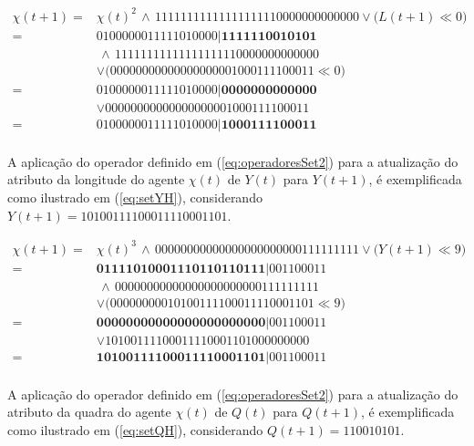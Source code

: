 \begin{equation}
 \begin{split}
 \chi(t + 1)   = & \chi(t)^2 \, \wedge \, 11111111111111111110000000000000 \vee \big(L(t + 1) \ll 0\big) \\
	       = & 0 1 0 0 0 0 0 0 1 1 1 1 1 0 1 0 0 0 0 | \boldsymbol{1 1 1 1 1 1 0 0 1 0 1 0 1} \\
	         & \, \wedge \, 11111111111111111110000000000000 \\
	         & \vee \big(00000000000000000001000111100011 \ll 0\big) \\
	       = & 0 1 0 0 0 0 0 0 1 1 1 1 1 0 1 0 0 0 0 | \boldsymbol{0 0 0 0 0 0 0 0 0 0 0 0 0} \\
	         & \vee 00000000000000000001000111100011 \\
	       = & 0 1 0 0 0 0 0 0 1 1 1 1 1 0 1 0 0 0 0 | \boldsymbol{1 0 0 0 1 1 1 1 0 0 0 1 1} \\
 \label{eq:setLH}
 \end{split}
\end{equation}

A aplicação do operador definido em (\ref{eq:operadoresSet2}) para a atualização do atributo da longitude do agente $\chi(t)$ de $Y(t)$ para $Y(t + 1)$, é exemplificada como ilustrado em (\ref{eq:setYH}), considerando $Y(t + 1) = 1 0 1 0 0 1 1 1 1 0 0 0 1 1 1 1 0 0 0 1 1 0 1$.

\begin{equation}
 \begin{split}
 \chi(t + 1)   = & \chi(t)^3 \, \wedge \, 00000000000000000000000111111111 \vee \big(Y(t + 1) \ll 9\big) \\
	       = & \boldsymbol{0 1 1 1 1 0 1 0 0 0 1 1 1 0 1 1 0 1 1 0 1 1 1} | 0 0 1 1 0 0 0 1 1 \\
	         & \, \wedge \, 00000000000000000000000111111111 \\
	         & \vee \big(00000000010100111100011110001101 \ll 9\big) \\
	       = & \boldsymbol{0 0 0 0 0 0 0 0 0 0 0 0 0 0 0 0 0 0 0 0 0 0 0} | 0 0 1 1 0 0 0 1 1 \\
	         & \vee 10100111100011110001101000000000 \\
	       = & \boldsymbol{1 0 1 0 0 1 1 1 1 0 0 0 1 1 1 1 0 0 0 1 1 0 1} | 0 0 1 1 0 0 0 1 1 \\
 \label{eq:setYH}
 \end{split}
\end{equation}

A aplicação do operador definido em (\ref{eq:operadoresSet2}) para a atualização do atributo da quadra do agente $\chi(t)$ de $Q(t)$ para $Q(t + 1)$, é exemplificada como ilustrado em (\ref{eq:setQH}), considerando $Q(t + 1) = 1 1 0 0 1 0 1 0 1$.

